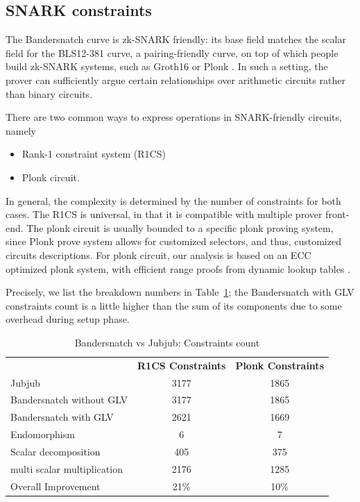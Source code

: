 \documentclass[smallextended]{svjour3}
\begin{document}
\subsection{SNARK constraints}
The Bandersnatch curve is zk-SNARK friendly: its 
base field matches the scalar field for the BLS12-381 curve, a 
pairing-friendly curve, on top of which people build zk-SNARK
systems, such as Groth16 \cite{EC:Groth16} or Plonk \cite{EPRINT:GabWilCio19}.
In such a setting, the prover can sufficiently argue certain 
relationships over arithmetic circuits rather than binary
circuits.

There are two common ways to express operations in SNARK-friendly circuits, namely
\begin{itemize}
  \item Rank-1 constraint system
  (R1CS)
  \item Plonk circuit.
\end{itemize}
In general, the complexity is determined by the 
number of constraints for both cases.
The R1CS is universal, in that it is compatible with multiple 
prover front-end. The plonk circuit is usually bounded to a specific
plonk proving system, since Plonk prove system allows for customized
selectors, and thus, customized circuits descriptions. For plonk
circuit,
our analysis is based on an ECC optimized plonk system, with 
efficient range proofs from dynamic lookup tables \cite{EPRINT:GabWil20}.


Precisely, we list the breakdown numbers in Table~\ref{tab:r1cs_full};
the  Bandersnatch with GLV constraints count is a little higher than
the sum of its components due to some overhead during setup phase.


\begin{table}[!ht]
  \centering%
  \begin{tabularx}{\textwidth}{lcc}
    & \textbf{R1CS Constraints}     & \textbf{Plonk Constraints}\\
    Jubjub& 3177 & 1865\\
    Bandersnatch without GLV& 3177 & 1865\\

    Bandersnatch with GLV&  2621&1669\\
    \quad Endomorphism & 6 & 7 \\
    \quad Scalar decomposition &  405 & 375\\
    \quad multi scalar multiplication & 2176& 1285 \\
    Overall Improvement & 21\%  & 10\% \\
  \end{tabularx}
  \caption{Bandersnatch vs Jubjub: Constraints count}
  \label{tab:r1cs_full}
\end{table}
\end{document}
